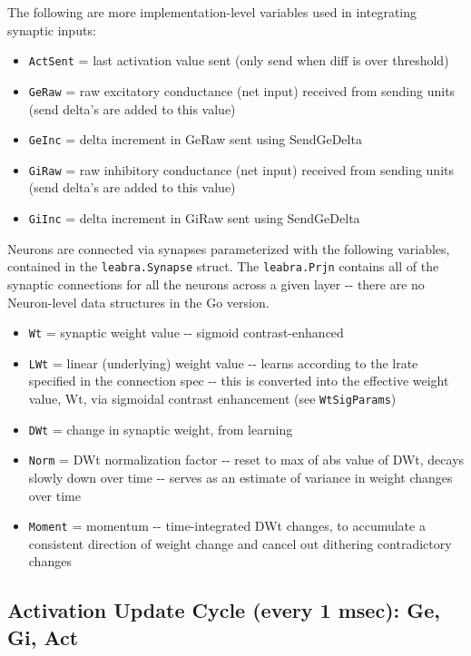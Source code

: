 The following are more implementation-level variables used in
integrating synaptic inputs:

\begin{itemize}
\tightlist
\item
  \texttt{ActSent} = last activation value sent (only send when diff is
  over threshold)
\item
  \texttt{GeRaw} = raw excitatory conductance (net input) received from
  sending units (send delta's are added to this value)
\item
  \texttt{GeInc} = delta increment in GeRaw sent using SendGeDelta
\item
  \texttt{GiRaw} = raw inhibitory conductance (net input) received from
  sending units (send delta's are added to this value)
\item
  \texttt{GiInc} = delta increment in GiRaw sent using SendGeDelta
\end{itemize}

Neurons are connected via synapses parameterized with the following
variables, contained in the \texttt{leabra.Synapse} struct. The
\texttt{leabra.Prjn} contains all of the synaptic connections for all
the neurons across a given layer -\/- there are no Neuron-level data
structures in the Go version.

\begin{itemize}
\tightlist
\item
  \texttt{Wt} = synaptic weight value -\/- sigmoid contrast-enhanced
\item
  \texttt{LWt} = linear (underlying) weight value -\/- learns according
  to the lrate specified in the connection spec -\/- this is converted
  into the effective weight value, Wt, via sigmoidal contrast
  enhancement (see \texttt{WtSigParams})
\item
  \texttt{DWt} = change in synaptic weight, from learning
\item
  \texttt{Norm} = DWt normalization factor -\/- reset to max of abs
  value of DWt, decays slowly down over time -\/- serves as an estimate
  of variance in weight changes over time
\item
  \texttt{Moment} = momentum -\/- time-integrated DWt changes, to
  accumulate a consistent direction of weight change and cancel out
  dithering contradictory changes
\end{itemize}

\hypertarget{activation-update-cycle-every-1-msec-ge-gi-act}{%
\subsection{Activation Update Cycle (every 1 msec): Ge, Gi,
Act}\label{activation-update-cycle-every-1-msec-ge-gi-act}}

